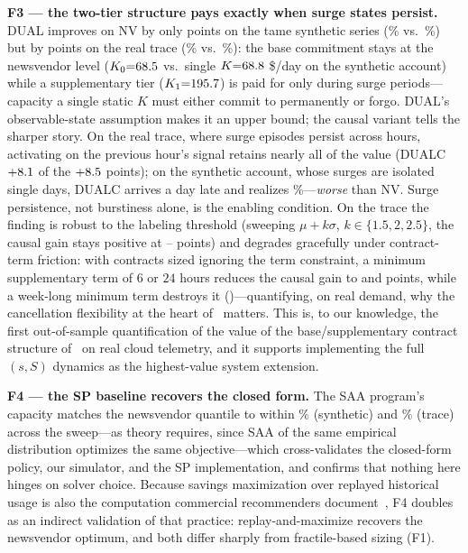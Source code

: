 \documentclass[10pt,journal]{IEEEtran}
\begin{document}
\textbf{F3 --- the two-tier structure pays exactly when surge states
persist.} DUAL improves on NV by only \polDualGain{} points on the
tame synthetic series (\polPctDual\% vs.\ \polPctNv\%) but by
\extPolDualGain{} points on the real trace (\extPolPctDual\% vs.\
\extPolPctNv\%): the base commitment stays at the newsvendor level
($K_0{=}68.5$ vs.\ single $K{=}68.8$ \$/day on the synthetic
account) while a supplementary tier ($K_1{=}195.7$) is paid for
only during surge periods---capacity a single static $K$ must either
commit to permanently or forgo. DUAL's observable-state assumption makes
it an upper bound; the causal variant tells the sharper story. On the real
trace, where surge episodes persist across hours, activating on the
previous hour's signal retains nearly all of the value (DUALC
$+8.1$ of the $+8.5$ points); on the synthetic
account, whose surges are isolated single days, DUALC arrives a day late
and realizes \polPctDualc\%---\emph{worse} than NV. Surge persistence, not
burstiness alone, is the enabling condition. On the trace the finding is
robust to the labeling threshold (sweeping $\mu{+}k\sigma$,
$k\in\{1.5,2,2.5\}$, the causal gain stays positive at
\extPolDualcGainThreshMin--\extPolDualcGainThreshMax{} points) and degrades
gracefully under contract-term friction: with contracts sized ignoring the
term constraint, a minimum supplementary term of
$6$ or $24$ hours reduces the causal gain to \extPolDualcGainHoldSix{} and
\extPolDualcGainHoldDay{} points, while a week-long minimum term destroys
it (\extPolDualcGainHoldWeek)---quantifying, on real demand, why the
cancellation flexibility at the heart of~\cite{chen2024capacity} matters.
This is, to our knowledge,
the first out-of-sample quantification of the value of the
base/supplementary contract structure of~\cite{chen2024capacity} on real
cloud telemetry, and it supports implementing the full $(s,S)$ dynamics as
the highest-value system extension.

\textbf{F4 --- the SP baseline recovers the closed form.} The SAA program's capacity matches the newsvendor
quantile to within \polSaaNvGapPct\% (synthetic) and \extPolSaaNvGapPct\%
(trace) across the sweep---as theory requires, since SAA of the same
empirical distribution optimizes the same objective---which cross-validates
the closed-form policy, our simulator, and the SP implementation, and
confirms that nothing here hinges on solver choice. Because savings
maximization over replayed historical usage is also the computation
commercial recommenders document~\cite{awsri2026,awssp2026,azureres2026},
F4 doubles as an indirect validation of that practice: replay-and-maximize
recovers the newsvendor optimum, and both differ sharply from
fractile-based sizing (F1).
\end{document}
